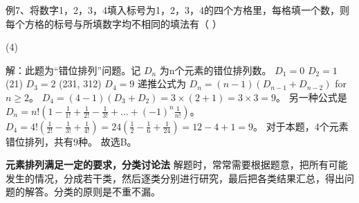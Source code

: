 \begin{example}
    例7、将数字1，2，3，4填入标号为1，2，3，4的四个方格里，每格填一个数，则每个方格的标号与所填数字均不相同的填法有（ ）
    \begin{tasks}(4)
    \end{tasks}
\end{example}
\begin{solution}
    解：此题为“错位排列”问题。记 $D_n$ 为n个元素的错位排列数。
    $D_1 = 0$
    $D_2 = 1$ (21)
    $D_3 = 2$ (231, 312)
    $D_4 = 9$
    递推公式为 $D_n = (n-1)(D_{n-1} + D_{n-2})$ for $n \ge 2$。
    $D_4 = (4-1)(D_3 + D_2) = 3 \times (2+1) = 3 \times 3 = 9$。
    另一种公式是 $D_n = n! \left(1 - \frac{1}{1!} + \frac{1}{2!} - \frac{1}{3!} + \dots + (-1)^n \frac{1}{n!}\right)$。
    $D_4 = 4! \left(\frac{1}{2!} - \frac{1}{3!} + \frac{1}{4!}\right) = 24 \left(\frac{1}{2} - \frac{1}{6} + \frac{1}{24}\right) = 12 - 4 + 1 = 9$。
    对于本题，4个元素错位排列，共有9种。
    故选B。
\end{solution}

\noindent\textbf{元素排列满足一定的要求，分类讨论法}
\newline
解题时，常常需要根据题意，把所有可能发生的情况，分成若干类，然后逐类分别进行研究，最后把各类结果汇总，得出问题的解答。分类的原则是不重不漏。

